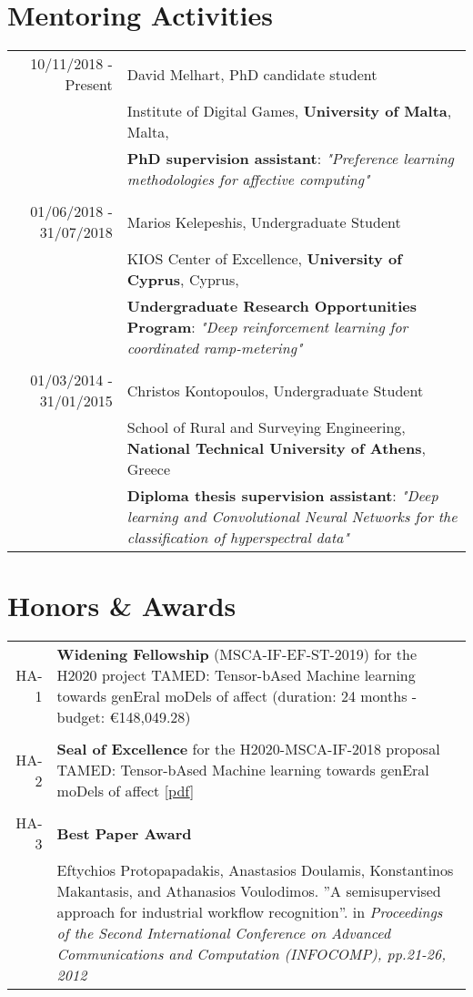 \documentclass[a4paper,10pt]{article}
\begin{document}
\section{Mentoring Activities}
\begin{longtable}{r|p{11cm}}
10/11/2018 - Present & David Melhart, PhD candidate student\\
& Institute of Digital Games, \textbf{University of Malta}, Malta,\\ 
& \small{\textbf{PhD supervision assistant}: \textit{"Preference learning methodologies for affective computing"}} \\
\multicolumn{2}{c}{} \\	

01/06/2018 - 31/07/2018 & Marios Kelepeshis, Undergraduate Student \\
& KIOS Center of Excellence, \textbf{University of Cyprus}, Cyprus,\\
& \small{\textbf{Undergraduate Research Opportunities Program}: \textit{"Deep reinforcement learning for coordinated ramp-metering"}} \\
\multicolumn{2}{c}{} \\	

01/03/2014 - 31/01/2015 & Christos Kontopoulos, Undergraduate Student\\ 
&School of Rural and Surveying Engineering, \textbf{National Technical University of Athens}, Greece \\
& \small{\textbf{Diploma thesis supervision assistant}: \textit{"Deep learning and Convolutional Neural Networks for the classification of hyperspectral data"}} \\
\end{longtable}


\section{Honors \& Awards}
\begin{longtable}{r p{12cm}}
HA-1 & \textbf{Widening Fellowship} (MSCA-IF-EF-ST-2019) \small{for the H2020 project TAMED: Tensor-bAsed Machine learning towards genEral moDels of affect (duration: 24 months - budget: €148,049.28)}\\
\multicolumn{2}{c}{} \\	

HA-2 & \textbf{Seal of Excellence} \small{for the H2020-MSCA-IF-2018 proposal TAMED: Tensor-bAsed Machine learning towards genEral moDels of affect [\href{https://bit.ly/2UMoiPl}{pdf}]}\\
\multicolumn{2}{c}{} \\	

HA-3 & \textbf{Best Paper Award} \\
&\small{Eftychios Protopapadakis, Anastasios Doulamis, Konstantinos Makantasis, and Athanasios Voulodimos. ''A semisupervised approach for industrial workflow recognition''. in \textit{Proceedings of the Second International Conference on Advanced Communications and Computation (INFOCOMP), pp.21-26, 2012}}\\
\end{longtable}
\end{document}
